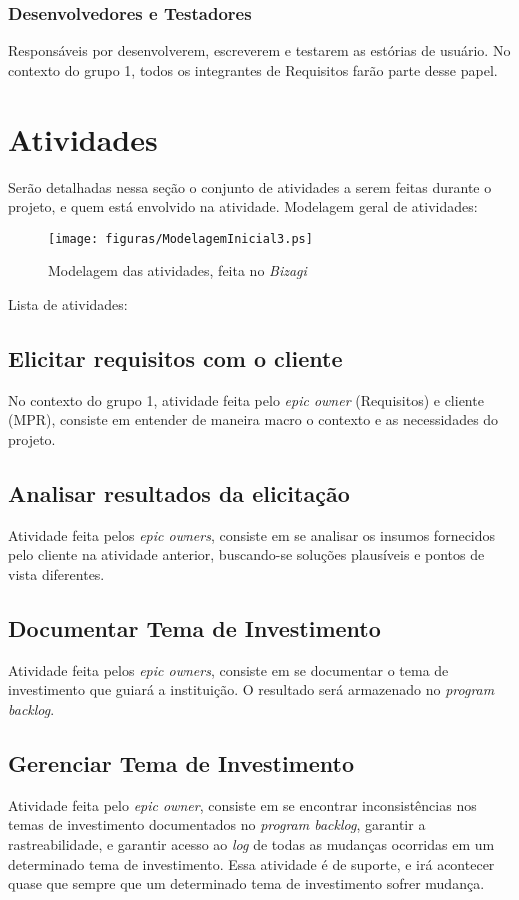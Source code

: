 \subsubsection{Desenvolvedores e Testadores}
Responsáveis por desenvolverem, escreverem e testarem as estórias de usuário. No contexto do grupo 1, todos os integrantes de Requisitos farão parte desse papel.

\newpage

\section{Atividades}
Serão detalhadas nessa seção o conjunto de atividades a serem feitas durante o projeto, e quem está envolvido na atividade.
Modelagem geral de atividades:

\begin{figure}[h]
  \centering
  \caption{Modelagem das atividades, feita no \emph{Bizagi}}
  \texttt{[image: figuras/ModelagemInicial3.ps]}
\end{figure}

Lista de atividades:
\subsection{Elicitar requisitos com o cliente}
No contexto do grupo 1, atividade feita pelo \emph{epic owner} (Requisitos) e cliente (MPR), consiste em entender de maneira macro o contexto e as necessidades do projeto.

\subsection{Analisar resultados da elicitação}
Atividade feita pelos \emph{epic owners}, consiste em se analisar os insumos fornecidos pelo cliente na atividade anterior, buscando-se soluções plausíveis e pontos de vista diferentes.

\subsection{Documentar Tema de Investimento}
Atividade feita pelos \emph{epic owners}, consiste em se documentar o tema de investimento que guiará a instituição. O resultado será armazenado no \emph{program backlog}.

\subsection{Gerenciar Tema de Investimento}
Atividade feita pelo \emph{epic owner}, consiste em se encontrar inconsistências nos temas de investimento documentados no \emph{program backlog}, garantir a rastreabilidade, e garantir acesso ao \emph{log} de todas as mudanças ocorridas em um determinado tema de investimento. Essa atividade é de suporte, e irá acontecer quase que sempre que um determinado tema de investimento sofrer mudança.

